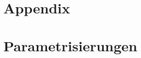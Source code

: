 \documentclass[8pt]{mpscheatsheet}
\begin{document}
    \section{Appendix}
    
    
    
    
    
    
    
    
    
    

    \newpage

    \section{Parametrisierungen}
        
        
\end{document}
